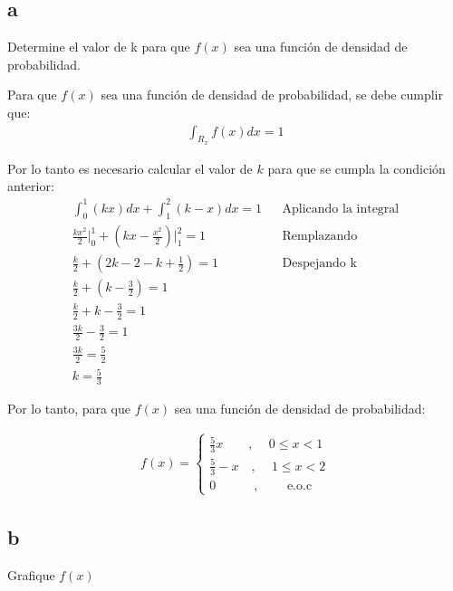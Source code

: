 \documentclass{templateNote}
\begin{document}
\subsection{a}
Determine el valor de k para que $f(x)$ sea una función de densidad de probabilidad.

Para que $f(x)$ sea una función de densidad de probabilidad, se debe cumplir que:
\begin{align*}
    \int_{R_x}{f(x)dx} = 1
\end{align*}

Por lo tanto es necesario calcular el valor de $k$ para que se cumpla la condición anterior:
\begin{align*}
    \int_{0}^{1}{(kx)dx} + \int_{1}^{2}{(k-x)dx} = 1 && \text{Aplicando la integral} \\
    \frac{kx^2}{2} \Big|_{0}^{1} + (kx - \frac{x^2}{2}) \Big|_{1}^{2} = 1 && \text{Remplazando} \\
    \frac{k}{2} + (2k - 2 - k + \frac{1}{2}) = 1 && \text{Despejando k}\\
    \frac{k}{2} + (k - \frac{3}{2}) = 1 \\
    \frac{k}{2} + k - \frac{3}{2} = 1 \\
    \frac{3k}{2} - \frac{3}{2} = 1 \\
    \frac{3k}{2} = \frac{5}{2} \\
    k = \frac{5}{3}
\end{align*}

Por lo tanto, para que $f(x)$ sea una función de densidad de probabilidad:

\begin{align*}
    f(x) = \begin{cases}
        \frac{5}{3}x \quad \quad \text{, } \quad 0 \leq x < 1 \\
        \frac{5}{3} - x \quad \text{, }\quad 1 \leq x < 2 \\
        0 \quad \quad \quad \text{, } \quad \quad \text{e.o.c}
    \end{cases}
\end{align*}

\newpage
\subsection{b}
Grafique $f(x)$
\end{document}
